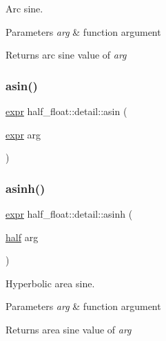 Arc sine. 
\begin{DoxyParams}{Parameters}
{\em arg} & function argument \\
\hline
\end{DoxyParams}
\begin{DoxyReturn}{Returns}
arc sine value of {\itshape arg} 
\end{DoxyReturn}
\mbox{\label{namespacehalf__float_1_1detail_ae1ccfb00bd0c246fc79582a98b173c5a}} 
\subsubsection{\texorpdfstring{asin()}{asin()}\hspace{0.1cm}{\footnotesize\ttfamily [2/2]}}
{\footnotesize\ttfamily \hyperlink{structhalf__float_1_1detail_1_1expr}{expr} half\+\_\+float\+::detail\+::asin (\begin{DoxyParamCaption}\item[{\hyperlink{structhalf__float_1_1detail_1_1expr}{expr}}]{arg }\end{DoxyParamCaption})\hspace{0.3cm}{\ttfamily [inline]}}

\mbox{\label{namespacehalf__float_1_1detail_aa5f5994b0842a116dc20f1603e1f4cbb}} 
\subsubsection{\texorpdfstring{asinh()}{asinh()}\hspace{0.1cm}{\footnotesize\ttfamily [1/2]}}
{\footnotesize\ttfamily \hyperlink{structhalf__float_1_1detail_1_1expr}{expr} half\+\_\+float\+::detail\+::asinh (\begin{DoxyParamCaption}\item[{\hyperlink{classhalf__float_1_1half}{half}}]{arg }\end{DoxyParamCaption})\hspace{0.3cm}{\ttfamily [inline]}}

Hyperbolic area sine. 
\begin{DoxyParams}{Parameters}
{\em arg} & function argument \\
\hline
\end{DoxyParams}
\begin{DoxyReturn}{Returns}
area sine value of {\itshape arg} 
\end{DoxyReturn}
\mbox{\label{namespacehalf__float_1_1detail_a16e8fe208bed6715d96720cd52484519}} 
